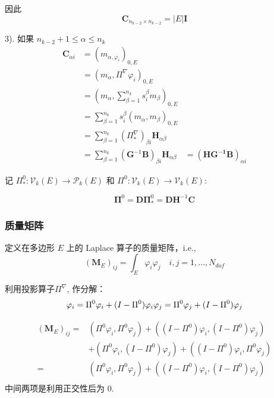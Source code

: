因此 \\
\begin{equation*}
\mathbf{C}_{n_{k-2}\times n_{k-2}} = |E|\mathbf{I}
\end{equation*}

3). 如果 $n_{k-2} + 1 \le \alpha \le n_k$ \\
\begin{equation*}
\begin{aligned}
\mathbf{C}_{\alpha i} & = (m_{\alpha, \varphi_i})_{0,E} \\
& = (m_{\alpha}, \Pi^{\nabla}\varphi_i)_{0,E} \\
& = (m_\alpha,\sum_{\beta = 1}^{n_k}s_i^{\beta}m_\beta)_{0,E} \\
& = \sum_{\beta = 1}^{n_k}s_i^{\beta}(m_\alpha,m_\beta)_{0,E} \\
& = \sum_{\beta = 1}^{n_k}(\Pi_{*}^\nabla)_{\beta i}\mathbf{H}_{\alpha\beta} \\
& = \sum_{\beta = 1}^{n_k}(\mathbf{G}^{-1}\mathbf{B})_{\beta i}\mathbf{H}_{\alpha\beta} 
& = (\mathbf{HG^{-1}B})_{\alpha i}
\end{aligned}
\end{equation*}

记 $\Pi_{*}^0: \mathcal V_k(E) \rightarrow \mathcal{P}_k(E)$ 和 $\Pi^0: \mathcal V_k(E) \rightarrow \mathcal V_k(E)$:

\begin{equation}
\boldsymbol \Pi^0 = \mathbf D\boldsymbol \Pi_{*}^0 = \mathbf D\mathbf H^{-1} \mathbf C 
\end{equation}

\subsubsection{质量矩阵}
定义在多边形 $E$ 上的 Laplace 算子的质量矩阵，i.e.,
\begin{equation*}
(\mathbf{M}_E)_{ij} = \int_{E}\varphi_i \varphi_j \quad i,j=1,...,N_{dof}
\end{equation*}

利用投影算子$\Pi^{\nabla}$, 作分解：
\begin{equation*}
\varphi_i = \Pi^{0} \varphi_i + (I-\Pi^{0})\varphi_i\\
\varphi_j = \Pi^{0} \varphi_j + (I-\Pi^{0})\varphi_j
\end{equation*}

\begin{equation}
\begin{aligned}
(\mathbf M_{E})_{i j} =& (\Pi^{0} \varphi_i, \Pi^{0} \varphi_j) + ((I-\Pi^{0})\varphi_i,(I-\Pi^{0})\varphi_j)\\
& + (\Pi^{0} \varphi_i,(I-\Pi^{0})\varphi_j)+((I-\Pi^{0})\varphi_i,\Pi^{0} \varphi_j)\\
= &(\Pi^{0} \varphi_i,  \Pi^{0} \varphi_j) + ((I-\Pi^{0})\varphi_i,(I-\Pi^{0})\varphi_j)\\
\end{aligned}
\end{equation}
中间两项是利用正交性后为 $0$.

